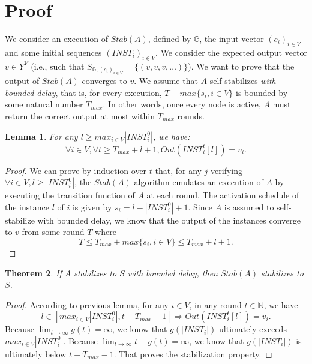 \documentclass[11pt,letterpaper]{article}
\newtheorem{thm}{Theorem}
\newtheorem{lem}[thm]{Lemma}
\begin{document}
\section{Proof}

We consider an execution of $Stab(A)$, defined by $\mathds{G}$, the input vector $(c_i)_{i \in V}$ and some initial sequences $(INST_i)_{i \in V}$.
We consider the expected output vector $v \in Y^V$ (i.e., such that $S_{\mathds{G}, (c_i)_{i \in V}} = \{(v, v, v, \dots)\}$).
We want to prove that the output of $Stab(A)$ converges to $v$.
We assume that $A$ self-stabilizes \textit{with bounded delay}, that is, for every execution,
$T-max\{s_i, i \in V\}$ is bounded by some natural number $T_{max}$.
In other words, once every node is active, $A$ must return the correct output at most within $T_{max}$ rounds.

\begin{lem}
	For any $l \geq max_{i \in V} |INST_i^0|$, we have:
	$$\forall i \in V, \forall t \geq T_{max}+l+1, Out(INST_i^t[l]) = v_i.$$
\end{lem}
\begin{proof}
	We can prove by induction over $t$ that, for any $j$ verifying $\forall i \in V, l \geq |INST_i^0|$,
	the $Stab(A)$ algorithm emulates an execution of $A$ by executing the transition function of $A$ at each round.
	The activation schedule of the instance $l$ of $i$ is given by $s_i = l-|INST_i^0|+1$.
	Since $A$ is assumed to self-stabilize with bounded delay, we know that the output of the instances converge to $v$ from some round $T$ where
	$$T \leq T_{max} + max\{s_i, i \in V\} \leq T_{max} + l + 1.$$
\end{proof}

\begin{thm}
	If $A$ stabilizes to $S$ with bounded delay, then $Stab(A)$ stabilizes to $S$.
\end{thm}
\begin{proof}
	According to previous lemma, for any $i \in V$, in any round $t \in \mathds{N}$, we have
	$$l \in [max_{i \in V} |INST_i^0|, t-T_{max}-1] \Rightarrow Out(INST_i^t[l]) = v_i.$$
	Because $\lim_{t \rightarrow \infty} g(t) = \infty$, we know that $g(|INST_i|)$ ultimately exceeds $max_{i \in V} |INST_i^0|$.
	Because $\lim_{t \rightarrow \infty} t-g(t) = \infty$, we know that $g(|INST_i|)$ is ultimately below $t-T_{max}-1$.
	That proves the stabilization property.
\end{proof}
\end{document}
